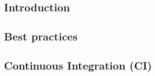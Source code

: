 \subsection{Introduction}



\subsection{Best practices}



\subsection{Continuous Integration (CI)}

